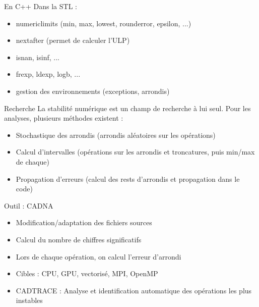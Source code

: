 \documentclass{beamer}
\begin{document}
  \begin{frame}{En C++}
    Dans la STL :
    \begin{itemize}
    \item numeric\textunderscore limits (min, max, lowest, round\textunderscore error, epsilon, ...)
    \item nextafter (permet de calculer l'ULP)
    \item isnan, isinf, ...
    \item frexp, ldexp, logb, ...
    \item gestion des environnements (exceptions, arrondis)
    \end{itemize}
  \end{frame}
  

  
  \begin{frame}{Recherche}
La stabilité numérique est un champ de recherche à lui seul. Pour les analyses, plusieurs méthodes existent : 
\begin{itemize}
\item Stochastique des arrondis (arrondis aléatoires sur les opérations)
\item Calcul d'intervalles (opérations sur les arrondis et troncatures, puis min/max de chaque)
\item Propagation d'erreurs (calcul des rests d'arrondis et propagation dans le code)
\end{itemize}
  \end{frame}  
  
    \begin{frame}{Outil : CADNA}
    \begin{itemize}
    \item Modification/adaptation des fichiers sources
    \item Calcul du nombre de chiffres significatifs
    \item Lors de chaque opération, on calcul l'erreur d'arrondi
    \item Cibles : CPU, GPU, vectorisé, MPI, OpenMP
    \item CADTRACE : Analyse et identification automatique des opérations les plus instables
    \end{itemize}
  \end{frame}
  
  
\end{document}
